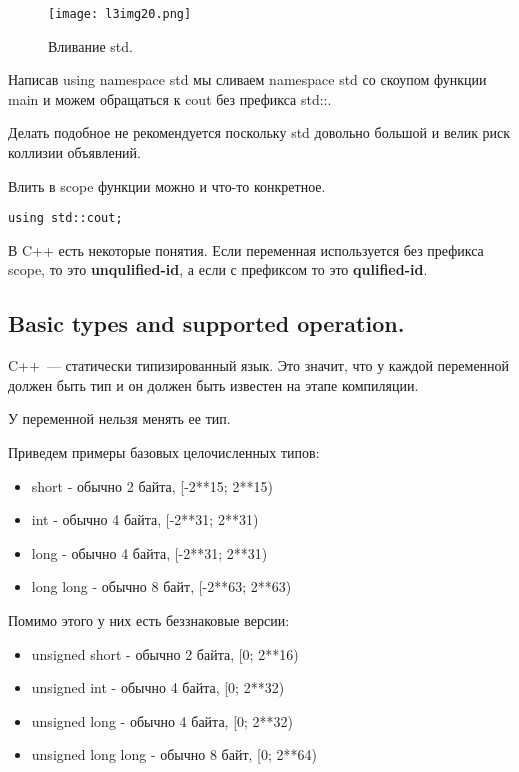 \begin{figure}[h]
    \centering
    \texttt{[image: l3img20.png]}
    \caption{Вливание std.}
    \label{l3img20}
\end{figure}

Написав using namespace std мы сливаем namespace std со скоупом функции main и можем обращаться к cout без префикса std::.

Делать подобное не рекомендуется поскольку std довольно большой и велик риск коллизии объявлений.

Влить в scope функции можно и что-то конкретное.

\begin{verbatim}
using std::cout;
\end{verbatim}

В C++ есть некоторые понятия. Если переменная используется без префикса scope, то это
\textbf{unqulified-id}, а если с префиксом то это \textbf{qulified-id}.

\subsection{Basic types and supported operation.}

C++~--- статически типизированный язык. Это значит, что у каждой переменной должен быть тип 
и он должен быть известен на этапе компиляции.

У переменной нельзя менять ее тип.

Приведем примеры базовых целочисленных типов:
\begin{itemize}
    \item short - обычно 2 байта, [-2**15; 2**15)
    \item int - обычно 4 байта, [-2**31; 2**31)
    \item long - обычно 4 байта, [-2**31; 2**31)
    \item long long - обычно 8 байт, [-2**63; 2**63)
\end{itemize}

Помимо этого у них есть беззнаковые версии:
\begin{itemize}
    \item unsigned short - обычно 2 байта, [0; 2**16)
    \item unsigned int - обычно 4 байта, [0; 2**32)
    \item unsigned long - обычно 4 байта, [0; 2**32)
    \item unsigned long long - обычно 8 байт, [0; 2**64)
\end{itemize}

